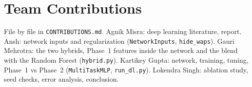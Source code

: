 \section*{Team Contributions}
File by file in \texttt{CONTRIBUTIONS.md}. Agnik Misra: deep learning
literature, report. Ansh: network inputs and regularization
(\texttt{NetworkInputs}, \texttt{hide\_waps}). Gauri Mehrotra: the two hybrids,
Phase~1 features inside the network and the blend with the Random Forest
(\texttt{hybrid.py}). Kartikey Gupta: network, training, tuning, Phase~1 vs
Phase~2 (\texttt{MultiTaskMLP}, \texttt{run\_dl.py}). Lokendra Singh: ablation
study, seed checks, error analysis, conclusion.
